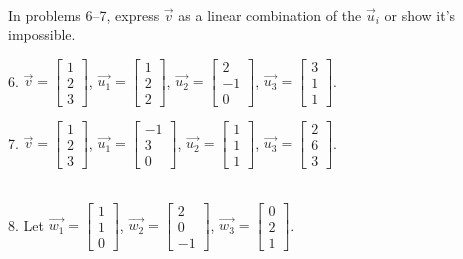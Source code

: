 \documentclass{article}
\begin{document}
~\\

In problems 6--7, express $\vec{v}$ as a linear combination of the $\vec{u}_i$ or show it's impossible.

6. $\vec{v} = \left[\begin{array}{c} 1 \\ 2 \\ 3 \end{array}\right]$, $\vec{u_1} = \left[\begin{array}{c} 1 \\ 2 \\ 2 \end{array}\right]$, $\vec{u_2} = \left[\begin{array}{c} 2 \\ -1 \\ 0 \end{array}\right]$, $\vec{u_3} = \left[\begin{array}{c} 3 \\ 1 \\ 1 \end{array}\right]$.

7. $\vec{v} = \left[\begin{array}{c} 1 \\ 2 \\ 3 \end{array}\right]$, $\vec{u_1} = \left[\begin{array}{c} -1 \\ 3 \\ 0 \end{array}\right]$, $\vec{u_2} = \left[\begin{array}{c} 1 \\ 1 \\ 1 \end{array}\right]$, $\vec{u_3} = \left[\begin{array}{c} 2 \\ 6 \\ 3 \end{array}\right]$.

~\\

8. Let $\vec{w_1} = \left[\begin{array}{c} 1 \\ 1 \\ 0 \end{array}\right]$, $\vec{w_2} = \left[\begin{array}{c} 2 \\ 0 \\ -1 \end{array}\right]$, $\vec{w_3} = \left[\begin{array}{c} 0 \\ 2 \\ 1 \end{array}\right]$.
\end{document}
